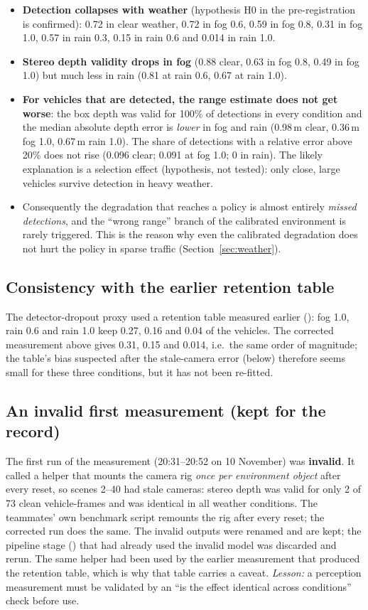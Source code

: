 \begin{itemize}
\item \textbf{Detection collapses with weather} (hypothesis H0 in the pre-registration is confirmed): 0.72 in clear weather, 0.72 in fog 0.6, 0.59 in fog 0.8, 0.31 in fog 1.0, 0.57 in rain 0.3, 0.15 in rain 0.6 and 0.014 in rain 1.0.
\item \textbf{Stereo depth validity drops in fog} (0.88 clear, 0.63 in fog 0.8, 0.49 in fog 1.0) but much less in rain (0.81 at rain 0.6, 0.67 at rain 1.0).
\item \textbf{For vehicles that are detected, the range estimate does not get worse}: the box depth was valid for 100\% of detections in every condition and the median absolute depth error is \emph{lower} in fog and rain (0.98\,m clear, 0.36\,m fog 1.0, 0.67\,m rain 1.0). The share of detections with a relative error above 20\% does not rise (0.096 clear; 0.091 at fog 1.0; 0 in rain).
  The likely explanation is a selection effect (hypothesis, not tested): only close, large vehicles survive detection in heavy weather.
\item Consequently the degradation that reaches a policy is almost entirely \emph{missed detections}, and the ``wrong range'' branch of the calibrated environment is rarely triggered. This is the reason why even the calibrated degradation does not hurt the policy in sparse traffic (Section~\ref{sec:weather}).
\end{itemize}

\subsection{Consistency with the earlier retention table}
The detector-dropout proxy used a retention table measured earlier (): fog 1.0, rain 0.6 and rain 1.0 keep 0.27, 0.16 and 0.04 of the vehicles. The corrected measurement above gives 0.31, 0.15 and 0.014, i.e.\ the same order of magnitude;
the table's bias suspected after the stale-camera error (below) therefore seems small for these three conditions, but it has not been re-fitted.

\subsection{An invalid first measurement (kept for the record)}
The first run of the measurement (20:31--20:52 on 10 November) was \textbf{invalid}. It called a helper that mounts the camera rig \emph{once per environment object} after every reset, so scenes 2--40 had stale cameras: stereo depth was valid for only 2 of 73 clean vehicle-frames and was identical in all weather conditions.
The teammates' own benchmark script remounts the rig after every reset; the corrected run does the same. The invalid outputs were renamed  and are kept; the pipeline stage () that had already used the invalid model was discarded and rerun. The same helper had been used by the earlier measurement that produced the retention table, which is why that table carries a caveat.
\emph{Lesson:} a perception measurement must be validated by an ``is the effect identical across conditions'' check before use.

